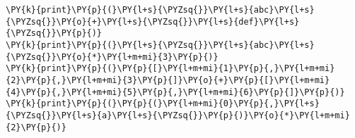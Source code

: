 \begin{Verbatim}[commandchars=\\\{\}]
\PY{k}{print}\PY{p}{(}\PY{l+s}{\PYZsq{}}\PY{l+s}{abc}\PY{l+s}{\PYZsq{}}\PY{o}{+}\PY{l+s}{\PYZsq{}}\PY{l+s}{def}\PY{l+s}{\PYZsq{}}\PY{p}{)}
\PY{k}{print}\PY{p}{(}\PY{l+s}{\PYZsq{}}\PY{l+s}{abc}\PY{l+s}{\PYZsq{}}\PY{o}{*}\PY{l+m+mi}{3}\PY{p}{)}
\PY{k}{print}\PY{p}{(}\PY{p}{[}\PY{l+m+mi}{1}\PY{p}{,}\PY{l+m+mi}{2}\PY{p}{,}\PY{l+m+mi}{3}\PY{p}{]}\PY{o}{+}\PY{p}{[}\PY{l+m+mi}{4}\PY{p}{,}\PY{l+m+mi}{5}\PY{p}{,}\PY{l+m+mi}{6}\PY{p}{]}\PY{p}{)}
\PY{k}{print}\PY{p}{(}\PY{p}{(}\PY{l+m+mi}{0}\PY{p}{,}\PY{l+s}{\PYZsq{}}\PY{l+s}{a}\PY{l+s}{\PYZsq{}}\PY{p}{)}\PY{o}{*}\PY{l+m+mi}{2}\PY{p}{)}
\end{Verbatim}
